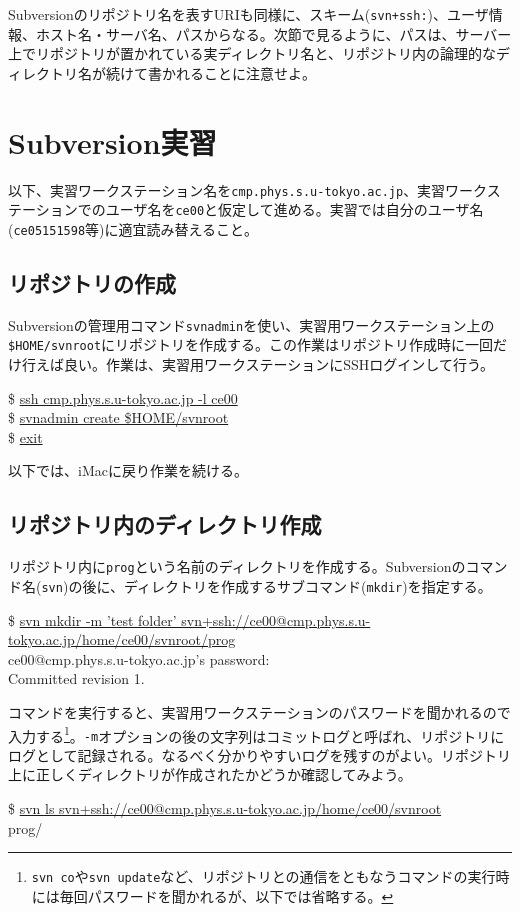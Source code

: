 \documentclass[a4j]{jsbook}
\newcommand{\prompt}{\$ }
\newenvironment{commandline2}{%
  \begin{tcolorbox}\tt%
}{%
  \end{tcolorbox}%
}
\begin{document}
Subversionのリポジトリ名を表すURIも同様に、スキーム({\tt svn+ssh:})、ユーザ情報、ホスト名・サーバ名、パスからなる。次節で見るように、パスは、サーバー上でリポジトリが置かれている実ディレクトリ名と、リポジトリ内の論理的なディレクトリ名が続けて書かれることに注意せよ。

\section{Subversion実習}

以下、実習ワークステーション名を{\tt cmp.phys.s.u-tokyo.ac.jp}、実習ワークステーションでのユーザ名を{\tt ce00}と仮定して進める。実習では自分のユーザ名({\tt ce05151598}等)に適宜読み替えること。

\subsection{リポジトリの作成}

Subversionの管理用コマンド{\tt svnadmin}を使い、実習用ワークステーション上の{\tt \$HOME/svnroot}にリポジトリを作成する。この作業はリポジトリ作成時に一回だけ行えば良い。作業は、実習用ワークステーションにSSHログインして行う。
\begin{commandline2}
\prompt \underline{ssh cmp.phys.s.u-tokyo.ac.jp -l ce00} \\
\prompt \underline{svnadmin create \$HOME/svnroot} \\
\prompt \underline{exit}
\end{commandline2} \noindent

以下では、iMacに戻り作業を続ける。

\subsection{リポジトリ内のディレクトリ作成}

リポジトリ内に{\tt prog}という名前のディレクトリを作成する。Subversionのコマンド名({\tt svn})の後に、ディレクトリを作成するサブコマンド({\tt mkdir})を指定する。
\begin{commandline2}
{\small \prompt \underline{svn mkdir -m 'test folder' svn+ssh://ce00@cmp.phys.s.u-tokyo.ac.jp/home/ce00/svnroot/prog}} \\
ce00@cmp.phys.s.u-tokyo.ac.jp's password: \\
Committed revision 1.
\end{commandline2} \noindent
コマンドを実行すると、実習用ワークステーションのパスワードを聞かれるので入力する\footnote{{\tt svn co}や{\tt svn update}など、リポジトリとの通信をともなうコマンドの実行時には毎回パスワードを聞かれるが、以下では省略する。}。{\tt -m}オプションの後の文字列はコミットログと呼ばれ、リポジトリにログとして記録される。なるべく分かりやすいログを残すのがよい。リポジトリ上に正しくディレクトリが作成されたかどうか確認してみよう。
\begin{commandline2}
\prompt \underline{svn ls svn+ssh://ce00@cmp.phys.s.u-tokyo.ac.jp/home/ce00/svnroot} \\
prog/
\end{commandline2} \noindent
\end{document}
